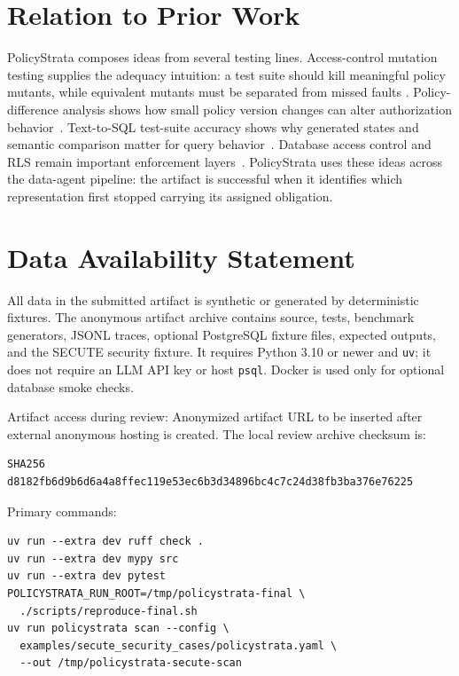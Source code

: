\documentclass[sigconf,review,anonymous]{acmart}
\newcommand{\tool}{PolicyStrata}
\newcommand{\ArtifactUrl}{Anonymized artifact URL to be inserted after external anonymous hosting is created.}
\begin{document}
\section{Relation to Prior Work}

\tool{} composes ideas from several testing lines. Access-control mutation
testing supplies the adequacy intuition: a test suite should kill meaningful
policy mutants, while equivalent mutants must be separated from missed faults
\cite{xacml_mutation}. Policy-difference analysis shows how small policy
version changes can alter authorization behavior~\cite{margrave}. Text-to-SQL
test-suite accuracy shows why generated states and semantic comparison matter
for query behavior~\cite{test_suite_accuracy}. Database access control and RLS
remain important enforcement layers~\cite{postgresql_rls}. \tool{} uses these
ideas across the data-agent pipeline: the artifact is successful when it
identifies which representation first stopped carrying its assigned obligation.

\section{Data Availability Statement}

All data in the submitted artifact is synthetic or generated by deterministic
fixtures. The anonymous artifact archive contains source, tests, benchmark
generators, JSONL traces, optional PostgreSQL fixture files, expected outputs,
and the SECUTE security fixture. It requires Python 3.10 or newer and
\texttt{uv}; it does not require an LLM API key or host \texttt{psql}. Docker is
used only for optional database smoke checks.

Artifact access during review: \ArtifactUrl{} The local review archive checksum
is:

\begin{scriptsize}
\begin{verbatim}
SHA256 d8182fb6d9b6d6a4a8ffec119e53ec6b3d34896bc4c7c24d38fb3ba376e76225
\end{verbatim}
\end{scriptsize}

Primary commands:

\begin{scriptsize}
\begin{verbatim}
uv run --extra dev ruff check .
uv run --extra dev mypy src
uv run --extra dev pytest
POLICYSTRATA_RUN_ROOT=/tmp/policystrata-final \
  ./scripts/reproduce-final.sh
uv run policystrata scan --config \
  examples/secute_security_cases/policystrata.yaml \
  --out /tmp/policystrata-secute-scan
\end{verbatim}
\end{scriptsize}



\end{document}

